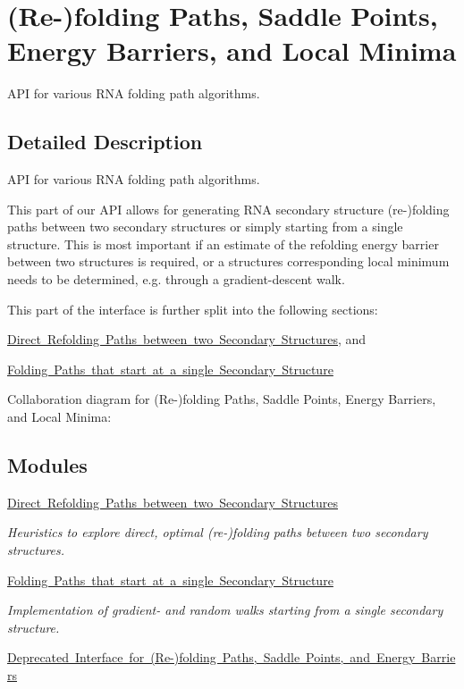 \hypertarget{group__paths}{}\section{(Re-\/)folding Paths, Saddle Points, Energy Barriers, and Local Minima}
\label{group__paths}


A\+PI for various R\+NA folding path algorithms.  




\subsection{Detailed Description}
A\+PI for various R\+NA folding path algorithms. 

This part of our A\+PI allows for generating R\+NA secondary structure (re-\/)folding paths between two secondary structures or simply starting from a single structure. This is most important if an estimate of the refolding energy barrier between two structures is required, or a structure\textquotesingle{}s corresponding local minimum needs to be determined, e.\+g. through a gradient-\/descent walk.

This part of the interface is further split into the following sections\+:
\begin{DoxyItemize}
\item \mbox{\hyperlink{group__paths__direct}{Direct Refolding Paths between two Secondary Structures}}, and
\item \mbox{\hyperlink{group__paths__walk}{Folding Paths that start at a single Secondary Structure}} 
\end{DoxyItemize}Collaboration diagram for (Re-\/)folding Paths, Saddle Points, Energy Barriers, and Local Minima\+:
\subsection*{Modules}
\begin{DoxyCompactItemize}
\item 
\mbox{\hyperlink{group__paths__direct}{Direct Refolding Paths between two Secondary Structures}}
\begin{DoxyCompactList}\small\item\em Heuristics to explore direct, optimal (re-\/)folding paths between two secondary structures. \end{DoxyCompactList}\item 
\mbox{\hyperlink{group__paths__walk}{Folding Paths that start at a single Secondary Structure}}
\begin{DoxyCompactList}\small\item\em Implementation of gradient-\/ and random walks starting from a single secondary structure. \end{DoxyCompactList}\item 
\mbox{\hyperlink{group__paths__deprecated}{Deprecated Interface for (\+Re-\/)folding Paths, Saddle Points, and Energy Barriers}}
\end{DoxyCompactItemize}
